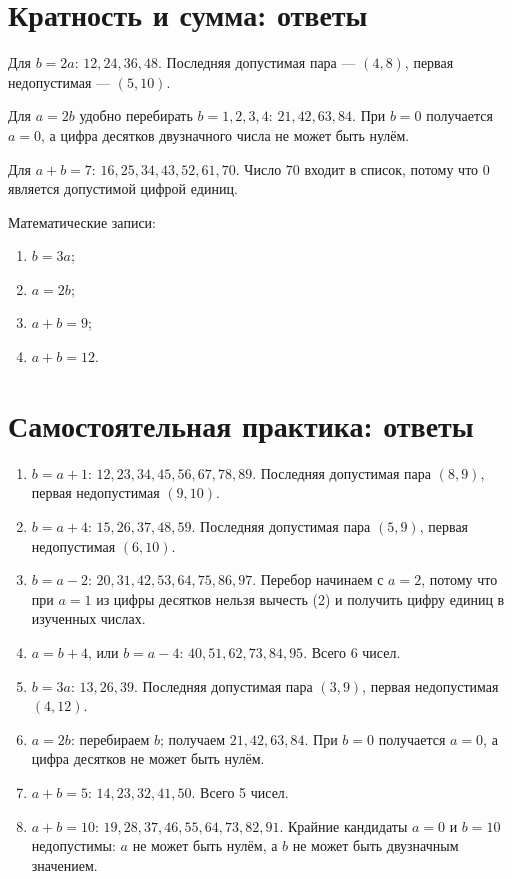 \section{Кратность и сумма: ответы}

Для \(b=2a\): \(12,24,36,48\). Последняя допустимая пара --- \((4,8)\),
первая недопустимая --- \((5,10)\).

Для \(a=2b\) удобно перебирать \(b=1,2,3,4\): \(21,42,63,84\). При \(b=0\)
получается \(a=0\), а цифра десятков двузначного числа не может быть нулём.

Для \(a+b=7\): \(16,25,34,43,52,61,70\). Число \(70\) входит в список,
потому что \(0\) является допустимой цифрой единиц.

Математические записи:
\begin{enumerate}
  \item \(b=3a\);
  \item \(a=2b\);
  \item \(a+b=9\);
  \item \(a+b=12\).
\end{enumerate}

\section{Самостоятельная практика: ответы}

\begin{enumerate}
  \item \(b=a+1\): \(12,23,34,45,56,67,78,89\). Последняя допустимая
    пара \((8,9)\), первая недопустимая \((9,10)\).
  \item \(b=a+4\): \(15,26,37,48,59\). Последняя допустимая пара \((5,9)\),
    первая недопустимая \((6,10)\).
  \item \(b=a-2\): \(20,31,42,53,64,75,86,97\). Перебор начинаем с
    \(a=2\), потому что при \(a=1\) из цифры десятков нельзя вычесть (2) и
    получить цифру единиц в изученных числах.
  \item \(a=b+4\), или \(b=a-4\): \(40,51,62,73,84,95\). Всего 6 чисел.
  \item \(b=3a\): \(13,26,39\). Последняя допустимая пара \((3,9)\), первая
    недопустимая \((4,12)\).
  \item \(a=2b\): перебираем \(b\); получаем \(21,42,63,84\). При \(b=0\)
    получается \(a=0\), а цифра десятков не может быть нулём.
  \item \(a+b=5\): \(14,23,32,41,50\). Всего 5 чисел.
  \item \(a+b=10\): \(19,28,37,46,55,64,73,82,91\). Крайние кандидаты
    \(a=0\) и \(b=10\) недопустимы: \(a\) не может быть нулём, а \(b\) не
    может быть двузначным значением.
\end{enumerate}

